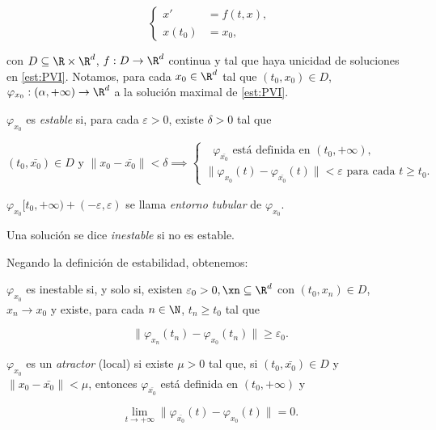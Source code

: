 \begin{equation}
\left\{\begin{array}{rl}
x' &=f(t,x), \\
x(t_0)&=x_0,
\end{array}\right.
\tag{P} \label{est:PVI}
\end{equation}

con $D \subseteq \R \times \R^d$, $f: D \to \R^d$ continua y tal que haya unicidad de soluciones en \ref{est:PVI}.
Notamos, para cada $x_0\in \R^d$ tal que $(t_0,x_0) \in D$, $\varphi_{x_0} : (\alpha, +\infty) \to \R^d$ a la solución maximal de \ref{est:PVI}.

\begin{ndef}
  $\varphi_{x_0}$ es \emph{estable} si, para cada $\varepsilon > 0$, existe $\delta > 0$ tal que

  \[
    (t_0, \bar{x_0}) \in D \text{ y } \|x_0 - \bar{x_0}\| < \delta \implies 
  \begin{cases}
    \text{ $\varphi_{\bar{x_0}}$ está definida en $(t_0, +\infty)$}, \\
    \|\varphi_{x_0}(t) - \varphi_{\bar{x_0}}(t)\| < \varepsilon \text{ para cada $t \ge t_0$}.
  \end{cases}
  \]

  $\varphi_{x_0}[t_0, +\infty)+(-\varepsilon, \varepsilon)$ se llama \emph{entorno tubular} de $\varphi_{x_0}$.
\end{ndef}

\begin{ndef}
  Una solución se dice \emph{inestable} si no es estable.
\end{ndef}


Negando la definición de estabilidad, obtenemos:

\begin{nprop}
  $\varphi_{x_0}$ es inestable si, y solo si, existen $\varepsilon_0 > 0, \xn \subseteq\R^d$ con
  $(t_0,x_n)\in D$, $x_n \to x_0$ y existe, para cada $n\in\N$, $t_n \ge t_0$ tal que

  \[
    \| \varphi_{x_n}(t_n) - \varphi_{x_0}(t_n) \| \ge \varepsilon_0
  .\]
\end{nprop}

\begin{ndef}[Atractor]
  $\varphi_{x_0}$ es un \emph{atractor} (local) si existe $\mu > 0$ tal que, si $(t_0, \bar{x_0})\in D$
  y $\| x_0 - \bar{x_0} \| < \mu$, entonces $\varphi_{\bar{x_0}}$ está definida en $(t_0, +\infty)$ y

  \[
     \lim_{t\to+\infty} \| \varphi_{\bar{x_0}}(t) - \varphi_{x_0}(t) \| = 0.
  \]
\end{ndef}


